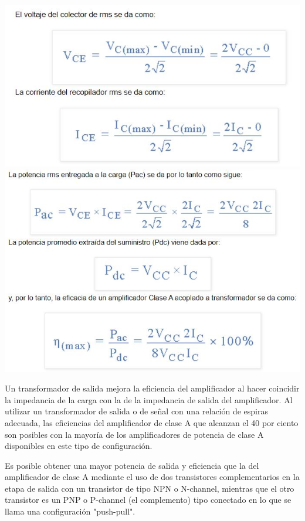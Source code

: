 \documentclass[12pt,a4paper]{article}
\begin{document}
\begin{center}
\includegraphics[scale=0.8]{imagenes/c3.JPG}
\newpage
\includegraphics[scale=0.8]{imagenes/c4.JPG} 
\end{center}
Un transformador de salida mejora la eficiencia del amplificador al hacer coincidir la impedancia de la carga con la de la impedancia de salida del amplificador. Al utilizar un transformador de salida o de señal con una relación de espiras adecuada, las eficiencias del amplificador de clase A que alcanzan el 40 por ciento son posibles con la mayoría de los amplificadores de potencia de clase A disponibles en este tipo de configuración.\linebreak

Es posible obtener una mayor potencia de salida y eficiencia que la del amplificador de clase A mediante el uso de dos transistores complementarios en la etapa de salida con un transistor de tipo NPN o N-channel, mientras que el otro transistor es un PNP o P-channel (el complemento) tipo conectado en lo que se llama una configuración "push-pull".\\
\newpage
\end{document}
